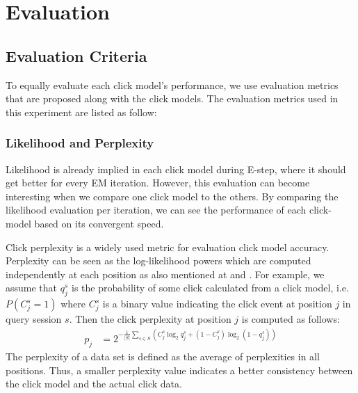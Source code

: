 \section{Evaluation}
\label{sec:evaluation}

\subsection{Evaluation Criteria}
To equally evaluate each click model's performance, we use evaluation metrics that are proposed along with the click models. The evaluation metrics used in this experiment are listed as follow:

\subsubsection{Likelihood and Perplexity}
Likelihood is already implied in each click model during E-step, where it should get better for every EM iteration. 
However, this evaluation can become interesting when we compare one click model to the others. 
By comparing the likelihood evaluation per iteration, we can see the performance of each click-model based on its convergent speed. 

Click perplexity is a widely used metric for evaluation click model accuracy.
Perplexity can be seen as the log-likelihood powers which are computed independently at each position as also mentioned at \cite{Zhang2011} and \cite{Dupret2008}. 
For example, we assume that $q_j^s$ is the probability of some click calculated from a click model, i.e. $P(C_j^s=1)$ where $C_j^s$ is a binary value indicating the click event at position $j$ in query session $s$. Then the click perplexity at position $j$ is computed as follows:
\begin{align*}
	p_j 
	&= 2^{-\frac{1}{|S|} \sum_{s \in S}(C_j^s \log_2 q_j^s + (1-C_j^s) \log_2 (1-q_j^s))}
\end{align*}
The perplexity of a data set is defined as the average of perplexities in all positions.
Thus, a smaller perplexity value indicates a better consistency between the click model and the actual click data.

